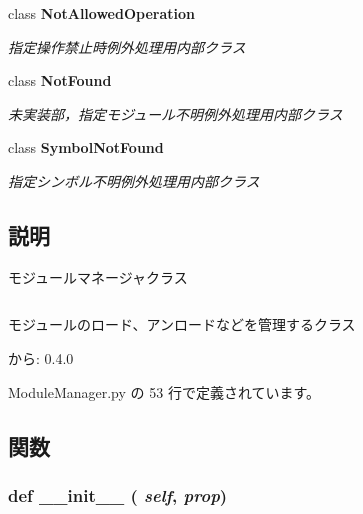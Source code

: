 \begin{CompactItemize}
class {\bf NotAllowedOperation}
\begin{CompactList}\small\item\em 指定操作禁止時例外処理用内部クラス \item\end{CompactList}\item 
class {\bf NotFound}
\begin{CompactList}\small\item\em 未実装部，指定モジュール不明例外処理用内部クラス \item\end{CompactList}\item 
class {\bf SymbolNotFound}
\begin{CompactList}\small\item\em 指定シンボル不明例外処理用内部クラス \item\end{CompactList}\end{CompactItemize}


\subsection{説明}
モジュールマネージャクラス 



\footnotesize\begin{verbatim}
\end{verbatim}
\normalsize


モジュールのロード、アンロードなどを管理するクラス

\begin{Desc}
\item[から:]0.4.0 \end{Desc}


 ModuleManager.py の 53 行で定義されています。

\subsection{関数}
\subsubsection{\setlength{\rightskip}{0pt plus 5cm}def \_\-\_\-init\_\-\_\- ( {\em self},  {\em prop})}\label{classsource__py_1_1_module_manager_1_1_module_manager_c775ee34451fdfa742b318538164070e}


